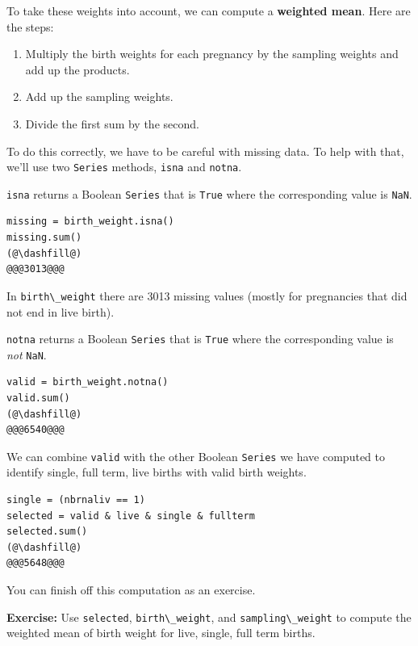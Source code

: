 To take these weights into account, we can compute a \textbf{weighted
mean}. Here are the steps:

\begin{enumerate}
\def\labelenumi{\arabic{enumi}.}
\item
  Multiply the birth weights for each pregnancy by the sampling weights
  and add up the products.
\item
  Add up the sampling weights.
\item
  Divide the first sum by the second.
\end{enumerate}

To do this correctly, we have to be careful with missing data. To help
with that, we'll use two \passthrough{\lstinline!Series!} methods,
\passthrough{\lstinline!isna!} and \passthrough{\lstinline!notna!}.

\passthrough{\lstinline!isna!} returns a Boolean
\passthrough{\lstinline!Series!} that is \passthrough{\lstinline!True!}
where the corresponding value is \passthrough{\lstinline!NaN!}.

\begin{lstlisting}[]
missing = birth_weight.isna()
missing.sum()
(@\dashfill@)
@@@3013@@@
\end{lstlisting}

In \passthrough{\lstinline!birth\_weight!} there are 3013 missing values
(mostly for pregnancies that did not end in live birth).

\passthrough{\lstinline!notna!} returns a Boolean
\passthrough{\lstinline!Series!} that is \passthrough{\lstinline!True!}
where the corresponding value is \emph{not}
\passthrough{\lstinline!NaN!}.

\begin{lstlisting}[]
valid = birth_weight.notna()
valid.sum()
(@\dashfill@)
@@@6540@@@
\end{lstlisting}

We can combine \passthrough{\lstinline!valid!} with the other Boolean
\passthrough{\lstinline!Series!} we have computed to identify single,
full term, live births with valid birth weights.

\begin{lstlisting}[]
single = (nbrnaliv == 1)
selected = valid & live & single & fullterm
selected.sum()
(@\dashfill@)
@@@5648@@@
\end{lstlisting}

You can finish off this computation as an exercise.

\textbf{Exercise:} Use \passthrough{\lstinline!selected!},
\passthrough{\lstinline!birth\_weight!}, and
\passthrough{\lstinline!sampling\_weight!} to compute the weighted mean
of birth weight for live, single, full term births.

